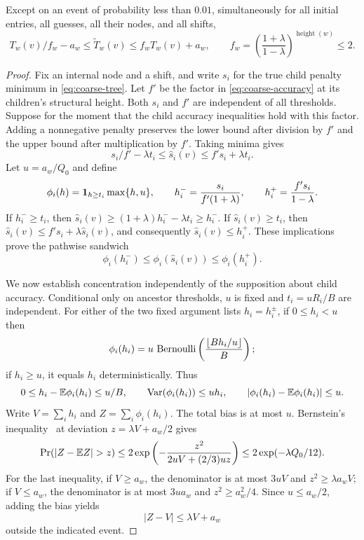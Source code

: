 \begin{lemma}\label{lem:coarse-precision}
Except on an event of probability less than $0.01$, simultaneously for all
initial entries, all guesses, all their nodes, and all shifts,
\begin{equation}\label{eq:coarse-accuracy}
 T_w(v)/f_w-a_w\le\widetilde T_w(v)\le f_wT_w(v)+a_w,
 \qquad
 f_w=\left(\frac{1+\lambda}{1-\lambda}\right)^{\operatorname{height}(w)}
 \le2.
\end{equation}
\end{lemma}
\begin{proof}
Fix an internal node and a shift, and write $s_i$ for the true child penalty minimum
in \eqref{eq:coarse-tree}. Let $f'$ be the factor in
\eqref{eq:coarse-accuracy} at its children's structural height. Both $s_i$
and $f'$ are independent of all thresholds. Suppose for the moment that
the child accuracy inequalities hold with this factor. Adding a nonnegative
penalty preserves the lower bound after division by $f'$ and the upper
bound after multiplication by $f'$.  Taking minima gives
\[
 s_i/f'-\lambda t_i\le\widehat s_i(v)\le f's_i+\lambda t_i.
\]
Let $u=a_w/Q_0$ and define
\[
 \phi_i(h)=\boldsymbol 1_{h\ge t_i}\max\{h,u\},\qquad
 h_i^- =\frac{s_i}{f'(1+\lambda)},\qquad
 h_i^+=\frac{f's_i}{1-\lambda}.
\]
If $h_i^-\ge t_i$, then
$\widehat s_i(v)\ge(1+\lambda)h_i^--\lambda t_i\ge h_i^-$.
If $\widehat s_i(v)\ge t_i$, then
$\widehat s_i(v)\le f's_i+\lambda\widehat s_i(v)$, and consequently
$\widehat s_i(v)\le h_i^+$.  These implications prove the pathwise sandwich
\begin{equation}\label{eq:threshold-sandwich}
 \phi_i(h_i^-)\le\phi_i(\widehat s_i(v))\le\phi_i(h_i^+).
\end{equation}

We now establish concentration independently of the supposition about child
accuracy.  Conditional only on ancestor thresholds, $u$ is fixed and
$t_i=uR_i/B$ are independent.  For either of the two fixed argument lists
$h_i=h_i^\pm$, if $0\le h_i<u$ then
\[
 \phi_i(h_i)=u\,\operatorname{Bernoulli}
       \left(\frac{\lfloor Bh_i/u\rfloor}B\right);
\]
if $h_i\ge u$, it equals $h_i$ deterministically.  Thus
\[
 0\le h_i-\mathbb E\phi_i(h_i)\le u/B,\qquad
 \operatorname{Var}(\phi_i(h_i))\le uh_i,
 \qquad |\phi_i(h_i)-\mathbb E\phi_i(h_i)|\le u.
\]
Write $V=\sum_i h_i$ and $Z=\sum_i\phi_i(h_i)$.  The total bias is at most
$u$.  Bernstein's inequality~\cite[Theorem~4.16]{Tropp2021Probability} at
deviation $z=\lambda V+a_w/2$ gives
\[
 \Pr(|Z-\E Z|>z)
 \le2\exp\left(-\frac{z^2}{2uV+(2/3)uz}\right)
 \le2\exp(-\lambda Q_0/12).
\]
For the last inequality, if $V\ge a_w$, the denominator is at most $3uV$
and $z^2\ge\lambda a_wV$; if $V\le a_w$, the denominator is at most
$3ua_w$ and $z^2\ge a_w^2/4$.  Since $u\le a_w/2$, adding the bias yields
\begin{equation}\label{eq:threshold-concentration}
 |Z-V|\le\lambda V+a_w
\end{equation}
outside the indicated event.


\end{proof}
